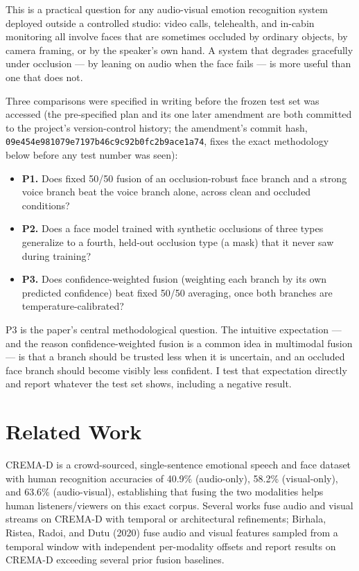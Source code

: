 \documentclass[10pt]{article}
\begin{document}
This is a practical question for any audio-visual emotion recognition system deployed outside a
controlled studio: video calls, telehealth, and in-cabin monitoring all involve faces that are sometimes
occluded by ordinary objects, by camera framing, or by the speaker's own hand. A system that degrades
gracefully under occlusion --- by leaning on audio when the face fails --- is more useful than one that does
not.

Three comparisons were specified in writing before the frozen test set was accessed (the pre-specified
plan and its one later amendment are both committed to the project's version-control history; the
amendment's commit hash, \texttt{09e454e981079e7197b46c9c92b0fc2b9ace1a74}, fixes the exact methodology below
before any test number was seen):

\begin{itemize}
\item \textbf{P1.} Does fixed 50/50 fusion of an occlusion-robust face branch and a strong voice branch beat the
  voice branch alone, across clean and occluded conditions?
\item \textbf{P2.} Does a face model trained with synthetic occlusions of three types generalize to a fourth,
  held-out occlusion type (a mask) that it never saw during training?
\item \textbf{P3.} Does confidence-weighted fusion (weighting each branch by its own predicted confidence) beat
  fixed 50/50 averaging, once both branches are temperature-calibrated?
\end{itemize}

P3 is the paper's central methodological question. The intuitive expectation --- and the reason
confidence-weighted fusion is a common idea in multimodal fusion --- is that a branch should be
trusted less when it is uncertain, and an occluded face branch should become visibly less confident. I
test that expectation directly and report whatever the test set shows, including a negative result.

\section{Related Work}

CREMA-D \citep{cao2014cremad} is a crowd-sourced, single-sentence emotional speech and face dataset with
human recognition accuracies of 40.9\% (audio-only), 58.2\% (visual-only), and 63.6\% (audio-visual),
establishing that fusing the two modalities helps human listeners/viewers on this exact corpus. Several
works fuse audio and visual streams on CREMA-D with temporal or architectural refinements; Birhala,
Ristea, Radoi, and Dutu (2020) \citep{birhala2020temporal} fuse audio and visual features sampled from a temporal window with
independent per-modality offsets and report results on CREMA-D exceeding several prior fusion baselines.
\end{document}

